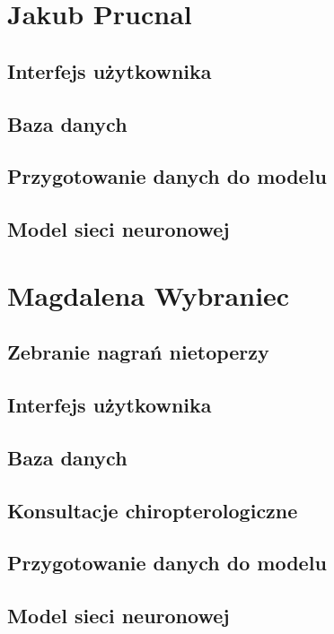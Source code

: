 \documentclass{sprz}
\begin{document}
\section{Jakub Prucnal}

\subsection{Interfejs użytkownika}

\subsection{Baza danych}

\subsection{Przygotowanie danych do modelu}

\subsection{Model sieci neuronowej}

\section{Magdalena Wybraniec}

\subsection{Zebranie nagrań nietoperzy}

\subsection{Interfejs użytkownika}

\subsection{Baza danych}

\subsection{Konsultacje chiropterologiczne}

\subsection{Przygotowanie danych do modelu}

\subsection{Model sieci neuronowej}
\end{document}
